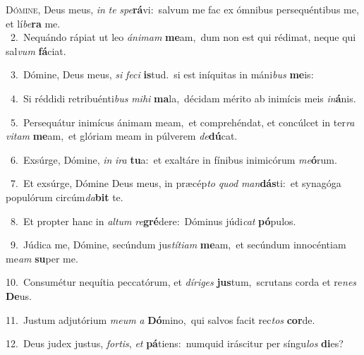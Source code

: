 \lettrine{\initial\textcolor{\initialcolor}{D}}{ómine,} Deus meus, \textit{in} \textit{te} \textit{spe}\-\textbf{rá}vi:~\star salvum me fac ex ómnibus persequéntibus me, et lí\-\textit{be}\-\textbf{ra} me.\\
{\numbfont\textcolor{\numbcolor}{~2.}}~Nequándo rápiat ut leo \textit{á}\-\textit{ni}\textit{mam} \textbf{me}\-am,~\star dum non est qui rédimat, neque qui sal\textit{vum} \textbf{fá}\-ciat.\par
{\numbfont\textcolor{\numbcolor}{~3.}}~Dómine, Deus meus, \textit{si} \textit{fe}\-\textit{ci} \textbf{is}\-tud.~\star si est iníquitas in máni\textit{bus} \textbf{me}\-is:\par
{\numbfont\textcolor{\numbcolor}{~4.}}~Si réddidi retribuénti\textit{bus} \textit{mi}\-\textit{hi} \textbf{ma}\-la,~\star décidam mérito ab inimícis meis \textit{in}\-\textbf{á}nis.\par
{\numbfont\textcolor{\numbcolor}{~5.}}~Persequátur inimícus ánimam meam,~\dagger et comprehéndat, et concúlcet in ter\textit{ra} \textit{vi}\-\textit{tam} \textbf{me}\-am,~\star et glóriam meam in púlverem \textit{de}\-\textbf{dú}cat.\par
{\numbfont\textcolor{\numbcolor}{~6.}}~Exsúrge, Dómine, \textit{in} \textit{i}\-\textit{ra} \textbf{tu}\-a:~\star et exaltáre in fínibus inimicórum \textit{me}\-\textbf{ó}rum.\par
{\numbfont\textcolor{\numbcolor}{~7.}}~Et exsúrge, Dómine Deus meus, in præcép\textit{to} \textit{quod} \textit{man}\-\textbf{dás}ti:~\star et synagóga populórum circúm\-\textit{da}\-\textbf{bit} te.\par
{\numbfont\textcolor{\numbcolor}{~8.}}~Et propter hanc in \textit{al}\-\textit{tum} \textit{re}\-\textbf{gré}dere:~\star Dóminus júdi\textit{cat} \textbf{pó}\-pulos.\par
{\numbfont\textcolor{\numbcolor}{~9.}}~Júdica me, Dómine, secúndum jus\-\textit{tí}\-\textit{ti}\textit{am} \textbf{me}\-am,~\star et secúndum innocéntiam me\textit{am} \textbf{su}\-per me.\par
{\numbfont\textcolor{\numbcolor}{10.}}~Consumétur nequítia peccatórum, et \textit{dí}\-\textit{ri}\textit{ges} \textbf{jus}\-tum,~\star scrutans corda et re\textit{nes} \textbf{De}\-us.\par
{\numbfont\textcolor{\numbcolor}{11.}}~Justum adjutórium \textit{me}\-\textit{um} \textit{a} \textbf{Dó}\-mino,~\star qui salvos facit rec\textit{tos} \textbf{cor}\-de.\par
{\numbfont\textcolor{\numbcolor}{12.}}~Deus judex justus, \textit{for}\-\textit{tis}, \textit{et} \textbf{pá}\-tiens:~\star numquid iráscitur per síngu\textit{los} \textbf{di}\-es?\par
